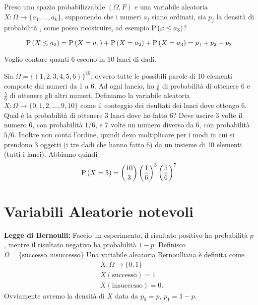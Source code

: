 \begin{exmp}
    Preso uno spazio probabilizzabile $ (\Omega, F) $ e una variabile aleatoria $ X : \Omega \to \{ a_1, \dots, a_k \} $, supponendo che i numeri $ a_j $ siano ordinati, sia $ p_j $ la densit\`a  di probabilit\`a , come posso ricostruire, ad esempio $ \text{P}\left(x \leq a_3\right) $?

    \begin{equation*}
        \text{P}\left(X \leq a_3\right) = \text{P}\left(X = a_1\right) + \text{P}\left(X = a_2\right) + \text{P}\left(X = a_3\right)=
        p_1+p_2+p_3
    \end{equation*}
\end{exmp}


\begin{exmp}
    Voglio contare quanti 6 escono in 10 lanci di dadi.
    
    Sia $ \Omega = \{ (1, 2, 3, 4, 5, 6)\}^{10} $, ovvero tutte le possibili parole di 10 elementi composte dai numeri da 1 a 6. Ad ogni lancio, ho $ \frac{1}{6} $ di probabilit\`a  di ottenere 6 e $ \frac{5}{6} $ di ottenere gli altri numeri. Definiamo la variabile aleatoria $ X : \Omega \to \{ 0, 1, 2, \dots, 9, 10 \} $ come il conteggio dei risultati dei lanci dove ottengo 6. Qual \`e la probabilit\`a  di ottenere 3 lanci dove ho fatto 6?
    Deve uscire 3 volte il numero 6, con probabilit\`a $1/6$, e 7 volte un numero diverso da 6,
    con probabilit\`a $5/6$. Inoltre non conta l'ordine, quindi devo moltiplicare per i modi in cui
    si prendono 3 oggetti (i tre dadi che hanno fatto 6) da un insieme di 10 elementi (tutti i lanci). 
    Abbiamo quindi
    \begin{equation*}
        \text{P}\left(X = 3\right) = \binom{10}{3} \left(\dfrac{1}{6}\right)^3 \left(\dfrac{5}{6}\right)^7 
    \end{equation*}
\end{exmp}

\section{Variabili Aleatorie notevoli}

\begin{defn}
    \textbf{Legge di Bernoulli:}
    Faccio un esperimento, il risultato positivo ha probabilit\`a  $ p $, mentre il risultato negativo ha probabilit\`a  $ 1 - p $. Definisco $ \Omega = \{\text{successo},\text{insuccesso}\}$
    Una variabile aleatoria Bernoulliana \`e definita come
    \begin{eqnarray*}
    & X : \Omega \to \{0,1\}\\
    &X(\text{successo})=1 \\
    &X(\text{insuccesso})=0.
    \end{eqnarray*}
    Ovviamente avremo la densit\`a di $X$ data da $p_0=p$, $p_1=1-p$.
\end{defn}

